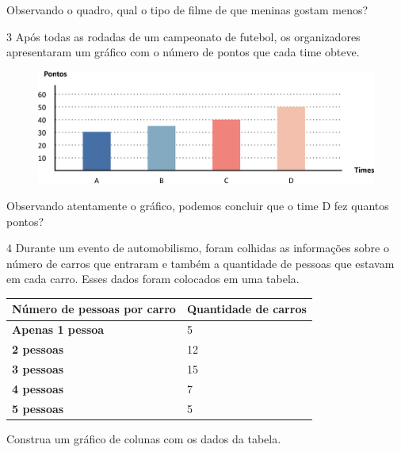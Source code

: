 Observando o quadro, qual o tipo de filme de que meninas gostam menos? 

\num{3} Após todas as rodadas de um campeonato de futebol, os organizadores
apresentaram um gráfico com o número de pontos que cada
time obteve.

\begin{figure}[htpb!]
\centering
\includegraphics[width=\textwidth]{./media/image80.png}
\end{figure}

Observando atentamente o gráfico, podemos concluir que o time D fez quantos pontos?

\num{4} Durante um evento de automobilismo, foram colhidas as informações sobre o número de carros
que entraram e também a quantidade de pessoas que estavam em cada carro.
Esses dados foram colocados em uma tabela.

\begin{longtable}[]{@{}ll@{}}
\toprule
\hline
\textbf{Número de pessoas por carro} & \textbf{Quantidade de carros}
\tabularnewline
\hline
\midrule
\endhead
\textbf{Apenas 1 pessoa} & 5\tabularnewline
\hline
\textbf{2 pessoas} & 12\tabularnewline
\hline
\textbf{3 pessoas} & 15\tabularnewline
\hline
\textbf{4 pessoas} & 7\tabularnewline
\hline
\textbf{5 pessoas} & 5\tabularnewline
\bottomrule
\end{longtable}

Construa um gráfico de colunas com os dados da tabela.

